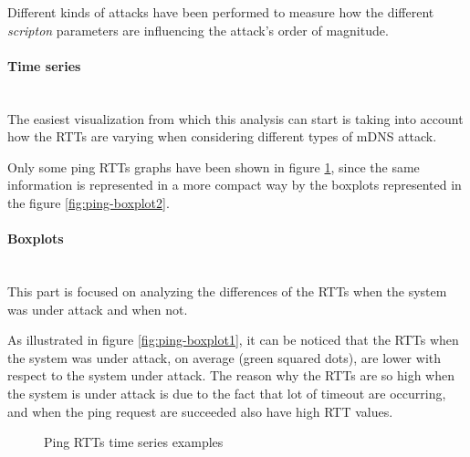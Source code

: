 \documentclass[fleqn, 11pt]{SelfArx} %
\begin{document}
Different kinds of attacks have been performed to measure how the different {\it{scripton}} parameters are influencing the attack's order of magnitude.

\paragraph{Time series}\mbox{}\\
The easiest visualization from which this analysis can start is taking into account how the RTTs are varying when considering different types of mDNS attack.

Only some ping RTTs graphs have been shown in figure \ref{fig:rtts-time-series}, since the same information is represented in a more compact way by the boxplots represented in the figure \ref{fig:ping-boxplot2}.

\paragraph{Boxplots}\mbox{}\\
This part is focused on analyzing the differences of the RTTs when the system was under attack and when not.

As illustrated in figure \ref{fig:ping-boxplot1}, it can be noticed that the RTTs when the system was under attack, on average (green squared dots), are lower with respect to the system under attack.
The reason why the RTTs are so high when the system is under attack is due to the fact that lot of timeout are occurring, and when the ping request are 
succeeded also have high RTT values.

\begin{figure}[H]
    \centering
    \qquad
    \caption{Ping RTTs time series examples}%
    \label{fig:rtts-time-series}%
\end{figure}
\end{document}
